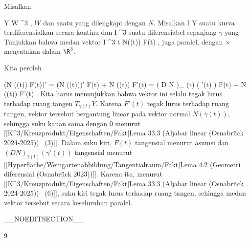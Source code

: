 {

Misalkan

\mavergleichskette
{\vergleichskette
{ Y
}
{ \subseteq }{ W
}
{ \subseteq }{ \R^3
}
{    }{
}
{   }{
}
}
{}{}{,}
$W$
dan suatu
yang dilengkapi dengan
$N$. Misalkan
\maabb {\gamma} { I } { Y
} {}
suatu kurva terdiferensialkan secara kontinu dan
 { I } { \R^3
} {}
suatu
diferensiabel sepanjang $\gamma$ yang
Tunjukkan bahwa medan vektor
\maabbeledisp {} { I } { \R^3
} { t } { N(\gamma(t)) \times F(t)
} {,}
juga paralel, dengan $\times$ menyatakan
dalam $\R^3$.

}
{

Kita peroleh

\mavergleichskettealign
{\vergleichskettealign
{ (N (\gamma(t)) \times F(t))'
}
{ =} { (N (\gamma(t)))' \times F(t) +  N (\gamma(t)) \times F'(t)
}
{ =} { \left(  D N   \right)_{ \gamma(t)} \left(   \gamma'(t)   \right)  \times F(t) +  N (\gamma(t)) \times F'(t)
}
{ } {
}
{ } {
}
}
{}
{}{.}
Kita harus menunjukkan bahwa vektor ini selalu tegak lurus terhadap ruang tangen $T_{\gamma(t)}Y$. Karena $F'(t)$ tegak lurus terhadap
ruang tangen, vektor tersebut bergantung linear pada vektor normal $N (\gamma(t))$, sehingga suku kanan sama dengan $0$ menurut
[[K^3/Kreuzprodukt/Eigenschaften/Fakt|Lema 33.3 (Aljabar linear (Osnabrück 2024-2025))  (3)]].
Dalam suku kiri, $F(t)$ tangensial menurut asumsi dan $\left(  D N   \right)_{ \gamma(t)} \left(   \gamma'(t)   \right)$ tangensial menurut
[[Hyperfläche/Weingartenabbildung/Tangentialraum/Fakt|Lema 4.2 (Geometri diferensial (Osnabrück 2023))]].
Karena itu, menurut
[[K^3/Kreuzprodukt/Eigenschaften/Fakt|Lema 33.3 (Aljabar linear (Osnabrück 2024-2025))  (6)]],
suku kiri tegak lurus terhadap ruang tangen, sehingga medan vektor tersebut secara keseluruhan paralel.

 }

__NOEDITSECTION__

{9}

